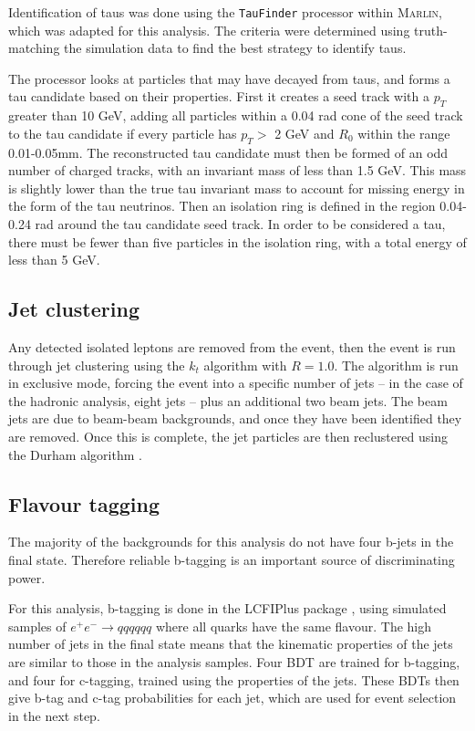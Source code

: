 Identification of taus was done using the \texttt{TauFinder} processor\cite{taufinder} within \textsc{Marlin}, which was adapted for this analysis. The criteria were determined using truth-matching the simulation data to find the best strategy to identify taus.

The processor looks at particles that may have decayed from taus, and forms a tau candidate based on their properties. First it creates a seed track with a $p_T$ greater than 10 GeV, adding all particles within a 0.04 rad cone of the seed track to the tau candidate if every particle has $p_T >$ 2 GeV and $R_0$ within the range 0.01-0.05mm. The reconstructed tau candidate must then be formed of an odd number of charged tracks, with an invariant mass of less than 1.5 GeV. This mass is slightly lower than the true tau invariant mass to account for missing energy in the form of the tau neutrinos. Then an isolation ring is defined in the region 0.04-0.24 rad around the tau candidate seed track. In order to be considered a tau, there must be fewer than five particles in the isolation ring, with a total energy of less than 5 GeV.

\subsection{Jet clustering}
Any detected isolated leptons are removed from the event, then the event is run through jet clustering using the $k_t$ algorithm \cite{kt-jet-clustering} with $R = 1.0$. The algorithm is run in exclusive mode, forcing the event into a specific number of jets -- in  the case of the hadronic analysis, eight jets -- plus an additional two beam jets. The beam jets are due to beam-beam backgrounds, and once they have been identified they are removed. Once this is complete, the jet particles are then reclustered using the Durham algorithm \cite{durham-jet-clustering}.

\subsection{Flavour tagging}
The majority of the backgrounds for this analysis do not have four b-jets in the final state. Therefore reliable b-tagging is an important source of discriminating power.

For this analysis, b-tagging is done in the LCFIPlus package \cite{lcfiplus}, using simulated samples of $e^+ e^- \rightarrow qqqqqq$ where all quarks have the same flavour. The high number of jets in the final state means that the kinematic properties of the jets are similar to those in the analysis samples. Four \acrfull{BDT} are trained for b-tagging, and four for c-tagging, trained using the properties of the jets. These \acrshort{BDT}s then give b-tag and c-tag probabilities for each jet, which are used for event selection in the next step.

